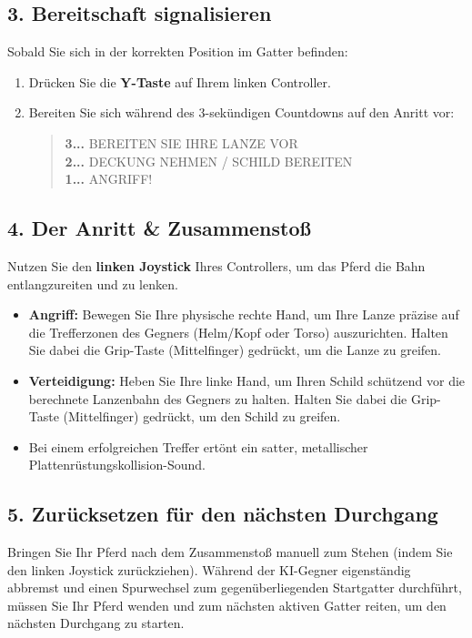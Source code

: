 \documentclass[11pt, a4paper]{article}
\begin{document}
\subsection{3. Bereitschaft signalisieren}
Sobald Sie sich in der korrekten Position im Gatter befinden:
\begin{enumerate}
    \item Drücken Sie die \textbf{Y-Taste} auf Ihrem linken Controller.
    \item Bereiten Sie sich während des 3-sekündigen Countdowns auf den Anritt vor:
    \begin{quote}
        \textbf{3...} BEREITEN SIE IHRE LANZE VOR \\
        \textbf{2...} DECKUNG NEHMEN / SCHILD BEREITEN \\
        \textbf{1...} ANGRIFF!
    \end{quote}
\end{enumerate}

\subsection{4. Der Anritt \& Zusammenstoß}
Nutzen Sie den \textbf{linken Joystick} Ihres Controllers, um das Pferd die Bahn entlangzureiten und zu lenken.
\begin{itemize}
    \item \textbf{Angriff:} Bewegen Sie Ihre physische rechte Hand, um Ihre Lanze präzise auf die Trefferzonen des Gegners (Helm/Kopf oder Torso) auszurichten. Halten Sie dabei die Grip-Taste (Mittelfinger) gedrückt, um die Lanze zu greifen.
    \item \textbf{Verteidigung:} Heben Sie Ihre linke Hand, um Ihren Schild schützend vor die berechnete Lanzenbahn des Gegners zu halten. Halten Sie dabei die Grip-Taste (Mittelfinger) gedrückt, um den Schild zu greifen.
    \item Bei einem erfolgreichen Treffer ertönt ein satter, metallischer Plattenrüstungskollision-Sound.
\end{itemize}

\subsection{5. Zurücksetzen für den nächsten Durchgang}
Bringen Sie Ihr Pferd nach dem Zusammenstoß manuell zum Stehen (indem Sie den linken Joystick zurückziehen). Während der KI-Gegner eigenständig abbremst und einen Spurwechsel zum gegenüberliegenden Startgatter durchführt, müssen Sie Ihr Pferd wenden und zum nächsten aktiven Gatter reiten, um den nächsten Durchgang zu starten.
\end{document}
